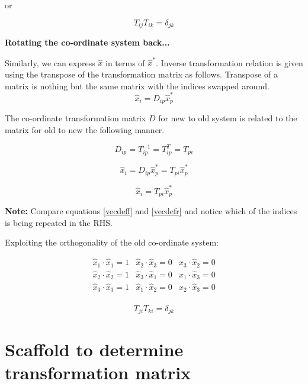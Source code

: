 or 

\begin{equation}
\boxed{
T_{ij}T_{ik} = \delta_{jk} 
}
\end{equation} 

{\bf Rotating the co-ordinate system back...}

Similarly, we can express $\hat{x}$ in terms of $\hat{x}^*$. Inverse transformation relation is given using the transpose of the transformation matrix as follows. Transpose of a matrix is nothing but the same matrix with the indices swapped around.
$$ \hat{x}_i = D_{ip} \hat{x}_p^*$$

The co-ordinate transformation matrix $D$ for new to old system is related to the matrix for old to new the following manner.

$$ D_{ip} = T_{ip}^{-1}= T_{ip}^{T} = T_{pi} $$

$$ \hat{x}_i = D_{ip} \hat{x}_p^* = T_{pi} \hat{x}_p^*$$

\begin{equation}
\label{vecdefr}
\boxed{\hat{x}_i = T_{pi} \hat{x}_p^*}
\end{equation}

{\bf Note:} Compare equations \ref{vecdeff} and \ref{vecdefr} and notice which of the indices is being repeated in the RHS.

Exploiting the orthogonality of the old co-ordinate system:

\begin{equation}
\begin{array}{lll}
\hat{x}_1 \cdot \hat{x}_1 = 1 & \hat{x}_2 \cdot \hat{x}_3 = 0 & \hat{x}_3 \cdot \hat{x}_2 = 0 \\
\hat{x}_2 \cdot \hat{x}_2 = 1 & \hat{x}_3 \cdot \hat{x}_1 = 0 & \hat{x}_1 \cdot \hat{x}_3 = 0 \\
\hat{x}_3 \cdot \hat{x}_3 = 1 & \hat{x}_1 \cdot \hat{x}_2 = 0 & \hat{x}_2 \cdot \hat{x}_3 = 0 \\
\end{array} 
\end{equation} 


\begin{equation}
\boxed{
T_{ji}T_{ki} = \delta_{jk}
}
\end{equation} 


\section{Scaffold to determine transformation matrix}

